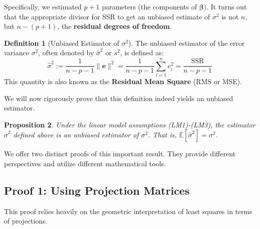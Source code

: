 \documentclass[11pt, letterpaper]{article}
\theoremstyle{definition}
\newtheorem{definition}{Definition}[section] %
\theoremstyle{plain} %
\newtheorem{proposition}[definition]{Proposition} %
\theoremstyle{remark}
\newcommand{\E}{\mathbb{E}}            %
\newcommand{\vb}[1]{\bm{#1}}          %
\newcommand{\betavec}{\vb{\beta}}     %
\newcommand{\evec}{\vb{e}}            %
\begin{document}
Specifically, we estimated $p+1$ parameters (the components of $\betavec$). It turns out that the appropriate divisor for SSR to get an unbiased estimate of $\sigma^2$ is not $n$, but $n - (p+1)$, the \textbf{residual degrees of freedom}.

\begin{definition}[Unbiased Estimator of $\sigma^2$]
The unbiased estimator of the error variance $\sigma^2$, often denoted by $\hat{\sigma}^2$ or $s^2$, is defined as:
\[
\hat{\sigma}^2 := \frac{1}{n-p-1} \|\evec\|^2 = \frac{1}{n-p-1} \sum_{i=1}^n e_i^2 = \frac{\text{SSR}}{n-p-1}
\]
This quantity is also known as the \textbf{Residual Mean Square} (RMS or MSE).
\end{definition}

We will now rigorously prove that this definition indeed yields an unbiased estimator.

\begin{proposition} \label{prop:sigmahat_unbiased}
Under the linear model assumptions (LM1)-(LM3), the estimator $\hat{\sigma}^2$ defined above is an unbiased estimator of $\sigma^2$. That is, $\E[\hat{\sigma}^2] = \sigma^2$.
\end{proposition}

We offer two distinct proofs of this important result. They provide different perspectives and utilize different mathematical tools.

\subsection{Proof 1: Using Projection Matrices}

This proof relies heavily on the geometric interpretation of least squares in terms of projections.
\end{document}
